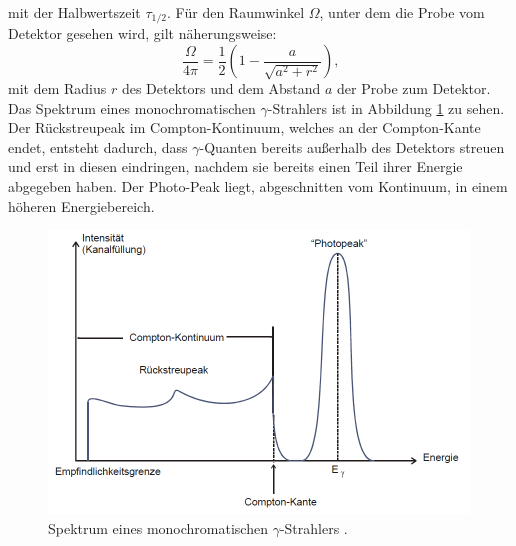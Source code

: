 mit der Halbwertszeit $\tau_{1/2}$.
Für den Raumwinkel $\Omega$, unter dem die Probe vom Detektor gesehen wird, gilt näherungsweise:
\begin{equation}
\frac{\Omega}{4\pi} = \frac{1}{2}\left(1-\frac{a}{\sqrt{a^2+r^2}}\right)\text{,}\label{eq:Omega}
\end{equation}
mit dem Radius $r$ des Detektors und dem Abstand $a$ der Probe zum Detektor.\newpage
\noindent Das Spektrum eines monochromatischen $\gamma$-Strahlers ist in Abbildung \ref{fig:Spektrum} zu sehen.
Der Rückstreupeak im Compton-Kontinuum, welches an der Compton-Kante endet, entsteht dadurch, dass $\gamma$-Quanten bereits außerhalb des Detektors streuen und erst in diesen eindringen, nachdem sie bereits einen Teil ihrer Energie abgegeben haben. Der Photo-Peak liegt, abgeschnitten vom Kontinuum, in einem höheren Energiebereich.
\begin{figure}
	\centering
	\includegraphics[width=\linewidth-70pt,height=\textheight-70pt,keepaspectratio]{content/images/Spektrum.pdf}
	\caption{Spektrum eines monochromatischen $\gamma$-Strahlers \cite{V18}.}
	\label{fig:Spektrum}
\end{figure}

